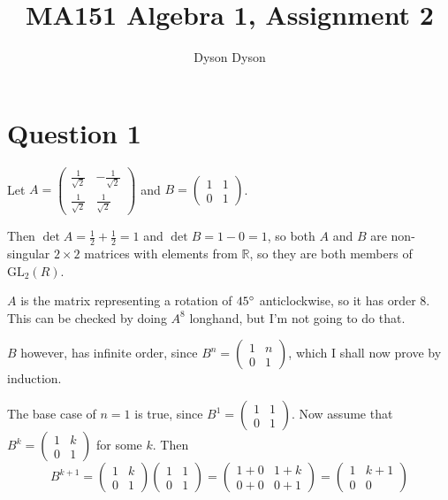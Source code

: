 \documentclass[a4paper]{article}
\title{MA151 Algebra 1, Assignment 2}
\author{Dyson Dyson}
\date{}
\begin{document}
\maketitle

\setlength{\parindent}{0em}
\setlength{\parskip}{1em}


\section*{Question 1}

Let $A = \begin{pmatrix} \frac1{\sqrt2} & -\frac1{\sqrt2}\\ \frac1{\sqrt2} & \frac1{\sqrt2} \end{pmatrix}$ and $B = \begin{pmatrix} 1 & 1\\ 0 & 1 \end{pmatrix}$.

Then $\det A = \frac12 + \frac12 = 1$ and $\det B = 1 - 0 = 1$, so both $A$ and $B$ are non-singular $2 \times 2$ matrices with elements from $\mathbb R$, so they are both members of $\text{GL}_2(R)$.

$A$ is the matrix representing a rotation of $45\degree$ anticlockwise, so it has order 8. This can be checked by doing $A^8$ longhand, but I'm not going to do that.

$B$ however, has infinite order, since $B^n = \begin{pmatrix} 1 & n\\ 0 & 1 \end{pmatrix}$, which I shall now prove by induction.

The base case of $n=1$ is true, since $B^1 = \begin{pmatrix} 1 & 1\\ 0 & 1 \end{pmatrix}$. Now assume that $B^k = \begin{pmatrix} 1 & k\\ 0 & 1 \end{pmatrix}$ for some $k$. Then $$B^{k+1} = \begin{pmatrix} 1 & k\\ 0 & 1 \end{pmatrix} \begin{pmatrix} 1 & 1\\ 0 & 1 \end{pmatrix} = \begin{pmatrix} 1+0 & 1+k\\ 0+0 & 0+1 \end{pmatrix} = \begin{pmatrix} 1 & k+1\\ 0 & 0 \end{pmatrix}$$
\end{document}
